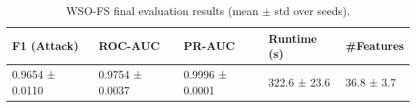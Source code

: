 \begin{table}
\caption{WSO-FS final evaluation results (mean $\pm$ std over seeds).}
\label{tab:wso_results}
\begin{tabular}{lllll}
\toprule
F1 (Attack) & ROC-AUC & PR-AUC & Runtime (s) & #Features \\
\midrule
0.9654 ± 0.0110 & 0.9754 ± 0.0037 & 0.9996 ± 0.0001 & 322.6 ± 23.6 & 36.8 ± 3.7 \\
\bottomrule
\end{tabular}
\end{table}
